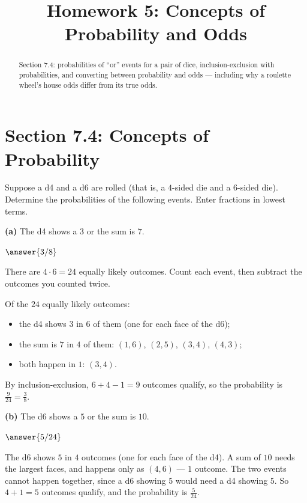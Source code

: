 \documentclass[12pt]{ximera}
\title{Homework 5: Concepts of Probability and Odds}
\begin{document}
\begin{abstract}
Section 7.4: probabilities of ``or'' events for a pair of dice, inclusion-exclusion
with probabilities, and converting between probability and odds --- including why a
roulette wheel's house odds differ from its true odds.
\end{abstract}
\maketitle

\section*{Section 7.4: Concepts of Probability}

\begin{problem}
Suppose a d4 and a d6 are rolled (that is, a $4$-sided die and a $6$-sided die).
Determine the probabilities of the following events. Enter fractions in lowest terms.

\begin{prompt}
\textbf{(a)} The d4 shows a $3$ or the sum is $7$.

$\answer{3/8}$

\begin{hint}
There are $4\cdot 6=24$ equally likely outcomes. Count each event, then subtract the
outcomes you counted twice.
\end{hint}

\begin{feedback}
Of the $24$ equally likely outcomes:
\begin{itemize}
\item the d4 shows $3$ in $6$ of them (one for each face of the d6);
\item the sum is $7$ in $4$ of them: $(1,6)$, $(2,5)$, $(3,4)$, $(4,3)$;
\item both happen in $1$: $(3,4)$.
\end{itemize}
By inclusion-exclusion, $6+4-1=9$ outcomes qualify, so the probability is
$\frac{9}{24}=\frac38$.
\end{feedback}
\end{prompt}

\begin{prompt}
\textbf{(b)} The d6 shows a $5$ or the sum is $10$.

$\answer{5/24}$

\begin{feedback}
The d6 shows $5$ in $4$ outcomes (one for each face of the d4). A sum of $10$ needs the
largest faces, and happens only as $(4,6)$ --- $1$ outcome. The two events cannot
happen together, since a d6 showing $5$ would need a d4 showing $5$. So $4+1=5$
outcomes qualify, and the probability is $\frac{5}{24}$.
\end{feedback}
\end{prompt}
\end{problem}
\end{document}
